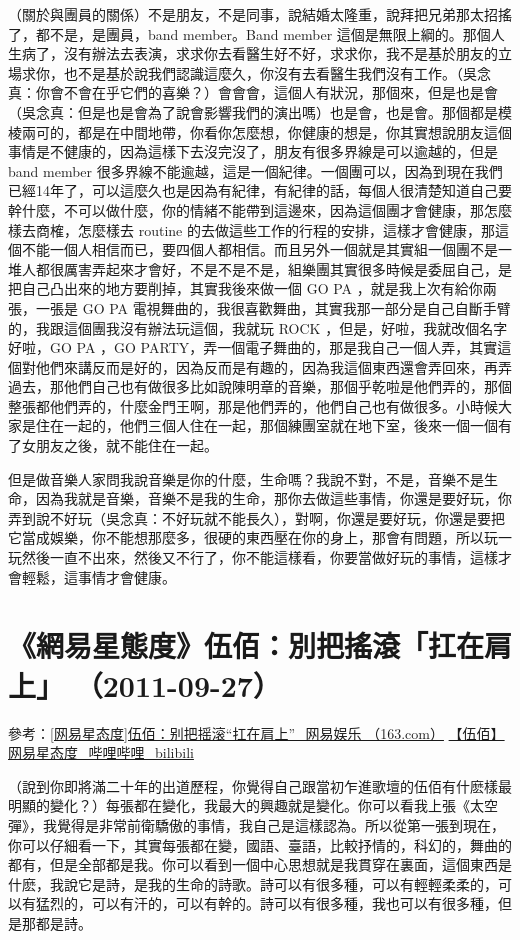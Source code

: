 \documentclass[UTF8,a4paper,oneside,twocolumn,12pt]{ctexbook}
\begin{document}
（關於與團員的關係）不是朋友，不是同事，說結婚太隆重，說拜把兄弟那太招搖了，都不是，是團員，band member。Band member 這個是無限上綱的。那個人生病了，沒有辦法去表演，求求你去看醫生好不好，求求你，我不是基於朋友的立場求你，也不是基於說我們認識這麼久，你沒有去看醫生我們沒有工作。（吳念真：你會不會在乎它們的喜樂？）會會會，這個人有狀況，那個來，但是也是會（吳念真：但是也是會為了說會影響我們的演出嗎）也是會，也是會。那個都是模棱兩可的，都是在中間地帶，你看你怎麼想，你健康的想是，你其實想說朋友這個事情是不健康的，因為這樣下去沒完沒了，朋友有很多界線是可以逾越的，但是 band member 很多界線不能逾越，這是一個紀律。一個團可以，因為到現在我們已經14年了，可以這麼久也是因為有紀律，有紀律的話，每個人很清楚知道自己要幹什麼，不可以做什麼，你的情緒不能帶到這邊來，因為這個團才會健康，那怎麼樣去商榷，怎麼樣去 routine 的去做這些工作的行程的安排，這樣才會健康，那這個不能一個人相信而已，要四個人都相信。而且另外一個就是其實組一個團不是一堆人都很厲害弄起來才會好，不是不是不是，組樂團其實很多時候是委屈自己，是把自己凸出來的地方要削掉，其實我後來做一個 GO PA ，就是我上次有給你兩張，一張是 GO PA 電視舞曲的，我很喜歡舞曲，其實我那一部分是自己自斷手臂的，我跟這個團我沒有辦法玩這個，我就玩 ROCK ，但是，好啦，我就改個名字好啦，GO PA ，GO PARTY，弄一個電子舞曲的，那是我自己一個人弄，其實這個對他們來講反而是好的，因為反而是有趣的，因為我這個東西還會弄回來，再弄過去，那他們自己也有做很多比如說陳明章的音樂，那個乎乾啦是他們弄的，那個整張都他們弄的，什麼金門王啊，那是他們弄的，他們自己也有做很多。小時候大家是住在一起的，他們三個人住在一起，那個練團室就在地下室，後來一個一個有了女朋友之後，就不能住在一起。

但是做音樂人家問我說音樂是你的什麼，生命嗎？我說不對，不是，音樂不是生命，因為我就是音樂，音樂不是我的生命，那你去做這些事情，你還是要好玩，你弄到說不好玩（吳念真：不好玩就不能長久），對啊，你還是要好玩，你還是要把它當成娛樂，你不能想那麼多，很硬的東西壓在你的身上，那會有問題，所以玩一玩然後一直不出來，然後又不行了，你不能這樣看，你要當做好玩的事情，這樣才會輕鬆，這事情才會健康。

\section{《網易星態度》伍佰：別把搖滾「扛在肩上」 （2011-09-27）}
參考：\href{https://www.163.com/ent/article/7F07EFOK00034NKD.html}{[网易星态度]伍佰：别把摇滚“扛在肩上”\_网易娱乐 （163.com）}
\href{https://www.bilibili.com/video/BV1C7411E7vm}{【伍佰】网易星态度\_哔哩哔哩\_bilibili}

（說到你即將滿二十年的出道歷程，你覺得自己跟當初乍進歌壇的伍佰有什麽樣最明顯的變化？）每張都在變化，我最大的興趣就是變化。你可以看我上張《太空彈》，我覺得是非常前衛驕傲的事情，我自己是這樣認為。所以從第一張到現在，你可以仔細看一下，其實每張都在變，國語、臺語，比較抒情的，科幻的，舞曲的都有，但是全部都是我。你可以看到一個中心思想就是我貫穿在裏面，這個東西是什麽，我說它是詩，是我的生命的詩歌。詩可以有很多種，可以有輕輕柔柔的，可以有猛烈的，可以有汗的，可以有幹的。詩可以有很多種，我也可以有很多種，但是那都是詩。
\end{document}
